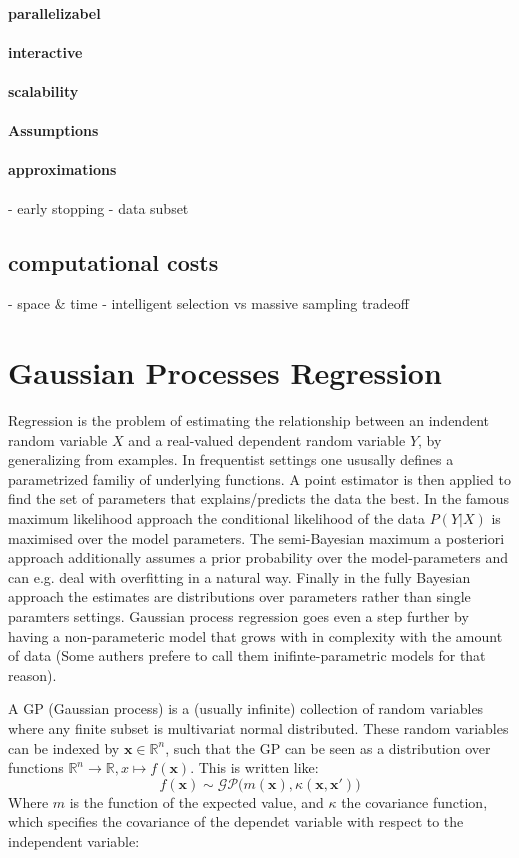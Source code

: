 \documentclass[english]{article}
\begin{document}
\paragraph{parallelizabel}
\paragraph{interactive}
\paragraph{scalability}
\paragraph{Assumptions}
\paragraph{approximations}
 - early stopping
 - data subset
 \subsection*{computational costs}
 - space \& time
 - intelligent selection vs massive sampling tradeoff


\section{Gaussian Processes Regression}
Regression is the problem of estimating the relationship between an indendent random variable $X$ and a real-valued dependent random variable $Y$, by generalizing from examples. In frequentist settings one ususally defines a parametrized familiy of underlying functions. A point estimator is then applied to find the set of parameters that explains/predicts the data the best. In the famous maximum likelihood approach the conditional likelihood of the data $P(Y|X)$ is maximised over the model parameters. The semi-Bayesian maximum a posteriori approach additionally assumes a prior probability over the model-parameters and can e.g. deal with overfitting in a natural way. Finally in the fully Bayesian approach the estimates are distributions over parameters rather than single paramters settings. Gaussian process regression goes even a step further by having a non-parameteric model that grows with in complexity with the amount of data (Some authers prefere to call them inifinte-parametric models for that reason).

A GP (Gaussian process) is a (usually infinite) collection of random variables where any finite subset is multivariat normal distributed. These random variables can be indexed by $\mathbf{x} \in \mathbb{R}^n$, such that the GP can be seen as a distribution over functions $\mathbb{R}^n \rightarrow \mathbb{R}, x \mapsto f(\mathbf{x})$. This is written like:
$$f(\mathbf{x}) \sim \mathcal{GP}\big(m(\mathbf{x}), \kappa(\mathbf{x},\mathbf{x}')\big)$$
Where $m$ is the function of the expected value, and $\kappa$ the covariance function, which specifies the covariance of the dependet variable with respect to the independent variable:
\end{document}
